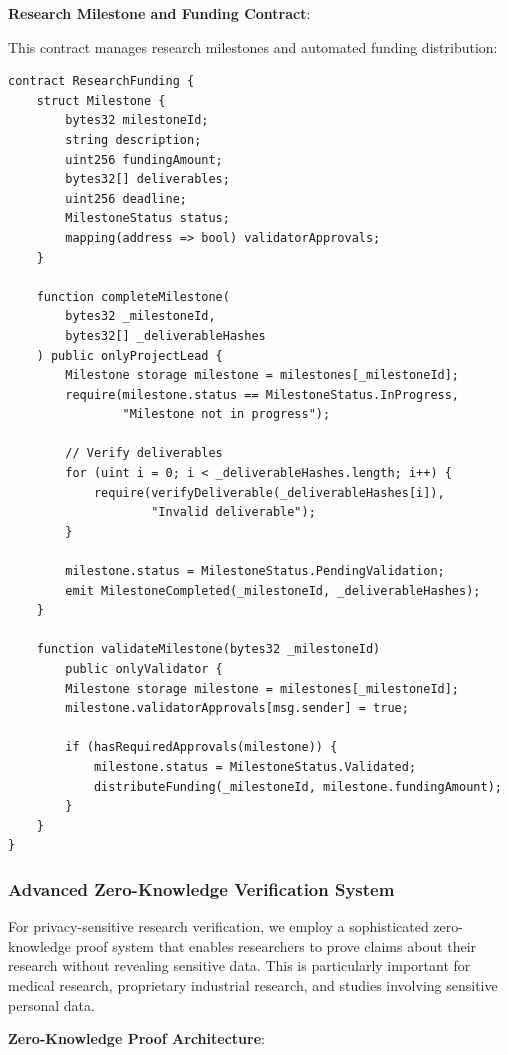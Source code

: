\documentclass[10pt,twocolumn]{article}
\begin{document}
\textbf{Research Milestone and Funding Contract}:

This contract manages research milestones and automated funding distribution:

\begin{verbatim}
contract ResearchFunding {
    struct Milestone {
        bytes32 milestoneId;
        string description;
        uint256 fundingAmount;
        bytes32[] deliverables;
        uint256 deadline;
        MilestoneStatus status;
        mapping(address => bool) validatorApprovals;
    }
    
    function completeMilestone(
        bytes32 _milestoneId,
        bytes32[] _deliverableHashes
    ) public onlyProjectLead {
        Milestone storage milestone = milestones[_milestoneId];
        require(milestone.status == MilestoneStatus.InProgress, 
                "Milestone not in progress");
        
        // Verify deliverables
        for (uint i = 0; i < _deliverableHashes.length; i++) {
            require(verifyDeliverable(_deliverableHashes[i]), 
                    "Invalid deliverable");
        }
        
        milestone.status = MilestoneStatus.PendingValidation;
        emit MilestoneCompleted(_milestoneId, _deliverableHashes);
    }
    
    function validateMilestone(bytes32 _milestoneId) 
        public onlyValidator {
        Milestone storage milestone = milestones[_milestoneId];
        milestone.validatorApprovals[msg.sender] = true;
        
        if (hasRequiredApprovals(milestone)) {
            milestone.status = MilestoneStatus.Validated;
            distributeFunding(_milestoneId, milestone.fundingAmount);
        }
    }
}
\end{verbatim}

\subsubsection{Advanced Zero-Knowledge Verification System}

For privacy-sensitive research verification, we employ a sophisticated zero-knowledge proof system that enables researchers to prove claims about their research without revealing sensitive data. This is particularly important for medical research, proprietary industrial research, and studies involving sensitive personal data.

\textbf{Zero-Knowledge Proof Architecture}:
\end{document}
